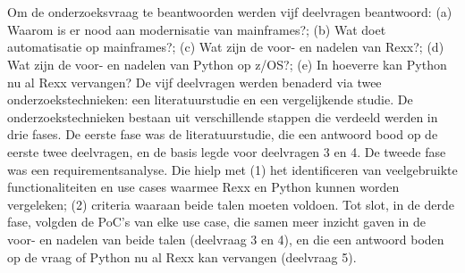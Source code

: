
\chapter{}%
\label{ch:methodologie}
Om de onderzoeksvraag te beantwoorden werden vijf deelvragen beantwoord: (a) Waarom is er nood aan modernisatie van mainframes?; (b) Wat doet automatisatie op mainframes?; (c) Wat zijn de voor- en nadelen van Rexx?; (d) Wat zijn de voor- en nadelen van Python op z/OS?; (e) In hoeverre kan Python nu al Rexx vervangen? De vijf deelvragen werden benaderd via twee onderzoekstechnieken: een literatuurstudie en een vergelijkende studie. De onderzoekstechnieken bestaan uit verschillende stappen die verdeeld werden in drie fases. De eerste fase was de literatuurstudie, die een antwoord bood op de eerste twee deelvragen, en de basis legde voor deelvragen 3 en 4. De tweede fase was een requirementsanalyse. Die hielp met (1) het identificeren van veelgebruikte functionaliteiten en use cases waarmee Rexx en Python kunnen worden vergeleken; (2) criteria waaraan beide talen moeten voldoen. Tot slot, in de derde fase, volgden de PoC's van elke use case, die samen meer inzicht gaven in de voor- en nadelen van beide talen (deelvraag 3 en 4), en die een antwoord boden op de vraag of Python nu al Rexx kan vervangen (deelvraag 5).


